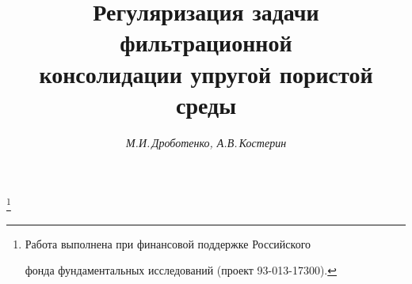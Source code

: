 









\newcommand{\Div}{\operatorname{div}}


\newcommand{\mes}{\operatorname{mes}}


\newcommand{\tts}[1]{}







 


\setcounter{page}{18}












\author{\it М.И.\,Дроботенко, А.В.\,Костерин}




\title{Регуляризация задачи фильтрационной\\


консолидации упругой пористой среды}





\thanks{Работа выполнена при финансовой поддержке Российского


фонда фундаментальных исследований (проект 93-013-17300).}


\date{}







\pagestyle{plain} %








